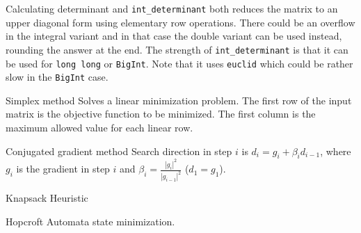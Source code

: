 \clearpage
{}
\categorycontents{}



\begin{algorithm}{Calculating determinant}
 and {\tt int\_determinant} both reduces the matrix
to an upper diagonal form using elementary row operations. There could be an
overflow in the integral variant and in that case the double variant
can be used instead, rounding the answer at the end. The strength of
{\tt int\_determinant} is that it can be used for {\tt long long} or
{\tt BigInt}. Note that it uses {\tt euclid} which could be rather
slow in the {\tt BigInt} case.
\end{algorithm}


\begin{algorithm}{Simplex method}
\desc
Solves a linear minimization problem. The first row of the
input matrix is the objective function to be minimized. The
first column is the maximum allowed value for each linear row.
\end{algorithm}

\begin{algorithm}{Conjugated gradient method}
\desc
Search direction in step $i$ is $d_i = g_i + \beta_i d_{i-1}$, where
$g_i$ is the gradient in step $i$ and $\beta_i =
\frac{|g_i|^2}{|g_{i-1}|^2}$ ($d_1 = g_1$).
\end{algorithm}

\begin{algorithm}{Knapsack Heuristic}
\end{algorithm}

\begin{algorithm}{Hopcroft}
\desc
Automata state minimization.
\end{algorithm}
